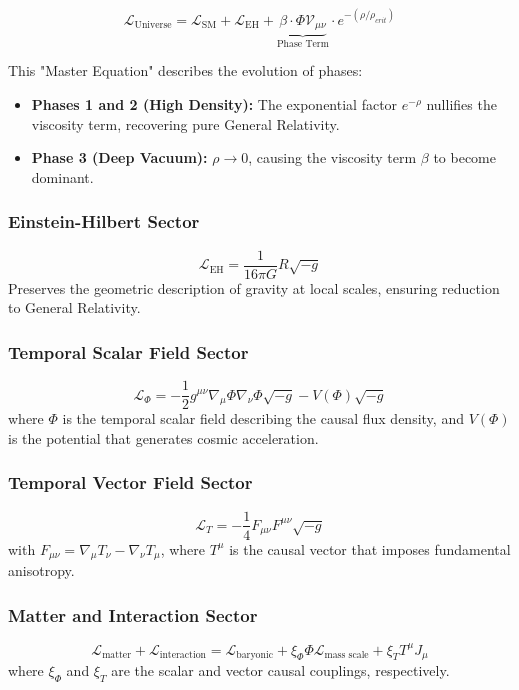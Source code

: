 \documentclass[12pt,a4paper]{article}
\begin{document}
\begin{equation}
    \mathcal{L}_{\text{Universe}} = \mathcal{L}_{\text{SM}} + \mathcal{L}_{\text{EH}} + \underbrace{\beta \cdot \Phi \mathcal{V}_{\mu\nu}}_{\text{Phase Term}} \cdot e^{-(\rho/\rho_{crit})}
\end{equation}

This "Master Equation" describes the evolution of phases:
\begin{itemize}
    \item \textbf{Phases 1 and 2 (High Density):} The exponential factor $e^{-\rho}$ nullifies the viscosity term, recovering pure General Relativity.
    \item \textbf{Phase 3 (Deep Vacuum):} $\rho \to 0$, causing the viscosity term $\beta$ to become dominant.
\end{itemize}

\subsubsection{Einstein-Hilbert Sector}
\begin{equation}
    \mathcal{L}_{\text{EH}} = \frac{1}{16\pi G} R \sqrt{-g}
\end{equation}
Preserves the geometric description of gravity at local scales, ensuring reduction to General Relativity.

\subsubsection{Temporal Scalar Field Sector}
\begin{equation}
    \mathcal{L}_{\Phi} = -\frac{1}{2} g^{\mu\nu} \nabla_\mu \Phi \nabla_\nu \Phi \sqrt{-g} - V(\Phi) \sqrt{-g}
\end{equation}
where $\Phi$ is the temporal scalar field describing the causal flux density, and $V(\Phi)$ is the potential that generates cosmic acceleration.

\subsubsection{Temporal Vector Field Sector}
\begin{equation}
    \mathcal{L}_T = -\frac{1}{4} F_{\mu\nu} F^{\mu\nu} \sqrt{-g}
\end{equation}
with $F_{\mu\nu} = \nabla_\mu T_\nu - \nabla_\nu T_\mu$, where $T^\mu$ is the causal vector that imposes fundamental anisotropy.

\subsubsection{Matter and Interaction Sector}
\begin{equation}
    \mathcal{L}_{\text{matter}} + \mathcal{L}_{\text{interaction}} = \mathcal{L}_{\text{baryonic}} + \xi_\Phi \Phi \mathcal{L}_{\text{mass scale}} + \xi_T T^\mu J_\mu
\end{equation}
where $\xi_\Phi$ and $\xi_T$ are the scalar and vector causal couplings, respectively.
\end{document}
